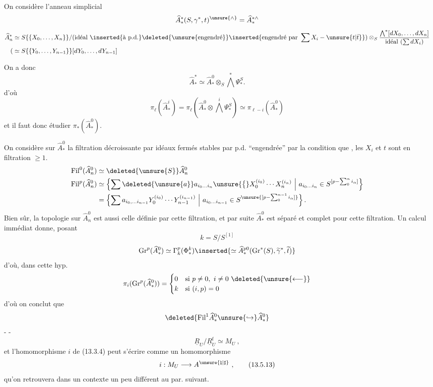 On considère l'anneau simplicial
\[
\widehat A_*^*(S,\gamma^*,t)^{\unsure{\wedge}}=\widehat A_*^{*\wedge}
\]
\[
\begin{aligned}
\widehat A_n^*&\simeq S\{\{X_0,\ldots,X_n\}\}/(\text{idéal }\inserted{\text{à p.d.}}\deleted{\text{\unsure{engendré}}}\inserted{\text{engendré par }\sum X_i-\unsure{t|\bar t}})\otimes_S\frac{\bigwedge^*[dX_0,\ldots,dX_n]}{\text{idéal }(\sum dX_i)}\\
(&\simeq S\{\{Y_0,\ldots,Y_{n-1}\}\}[dY_0,\ldots,dY_{n-1}]
\end{aligned}
\]
\deleted{$\simeq$}

On a donc
\[
\widehat A_*^*\simeq\widehat A_*^0\otimes_S\bigwedge^*\Psi_*^S.
\]
d'où
\[
\pi_\ell(\widehat A_*^i)=\pi_\ell(\widehat A_*^0\otimes\bigwedge^i\Psi_*^S)\simeq\pi_{\ell-i}(\widehat A_*^0)
\]
et il faut donc étudier $\pi_*(\widehat A_*^0)$.

On considère sur $\widehat A_*^0$  la filtration décroissante par idéaux fermés stables par p.d. ``engendrée'' par la condition que  , les $X_i$ et $t$ sont en filtration $\geq1$. 
\[
\begin{aligned}
\mathrm{Fil}^0(\widehat A_n^0)&\simeq\deleted{\unsure{S}}\widehat A_n^0\\
\mathrm{Fil}^p(\widehat A_n^0)&\simeq\left\{\sum\deleted{\unsure{a}}a_{i_0\ldots i_n}\unsure{\big\{}X_0^{(i_0)}\cdots X_n^{(i_n)}\ \middle|\ a_{i_0\ldots i_n}\in S^{[p-\sum_0^n i_\alpha]}\right\}\\
&=\left\{\sum a_{i_0,\ldots i_{n-1}}Y_0^{(i_0)}\cdots Y_{n-1}^{(i_{n-1})}\ \middle|\ a_{i_0\ldots i_{n-1}}\in S^{\unsure{[p-\sum_0^{n-1}i_\alpha]}}\right\}.
\end{aligned}
\]
Bien sûr, la topologie  sur $\widehat A_n^0$ est aussi celle définie par cette filtration, et par suite $\widehat A_*^0$ est séparé et complet pour cette filtration. Un calcul immédiat donne, posant
\[
k=S/S^{[1]}
\]
\[
\mathrm{Gr}^p(\widehat A_*^0)\simeq\Gamma_k^p(\Phi_*^k)
\inserted{\simeq\widehat A_*^{p0}(\mathrm{Gr}^*(S),\widetilde\gamma^*,\widetilde t)}
\]
d'où, dans cette hyp. 
\[
\pi_i(\mathrm{Gr}^p(\widehat A_*^0))=\begin{cases}0&\text{si }p\ne0,\ i\ne0\ \deleted{\unsure{\longleftarrow}}\\k&\text{si }(i,p)=0\end{cases}
\]
d'où on conclut que 
\[
\deleted{\mathrm{Fil}^1\widehat A_*^0\unsure{\hookrightarrow}\widehat A_*^0}
\]
-  - 
\[
\underline R_U/\underline R_U^{\mathrm f}\simeq M_U\ ,\tag{13.5.12}
\]
et l'homomorphisme $i$ de (13.3.4) peut s'écrire comme un homomorphisme
\[
i:M_U\longrightarrow A^{\unsure{\natural|\sharp}}\ ,\tag{13.5.13}
\]
qu'on retrouvera dans un contexte un peu différent au par. suivant.

